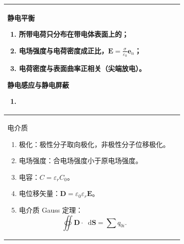 \documentclass[UTF8,fontset=fandol,zihao=5]{ctexart}
\newcommand{\vect}[1]{\bm{#1}}
\newcommand{\dif}{\mathop{}\!\mathrm{d}}
\begin{document}
\begin{longtable}{|>{\raggedright\arraybackslash}p{}|>{\raggedright\arraybackslash}p{}|}
静电平衡
\begin{enumerate}
  \item 所带电荷只分布在带电体表面上的；
  \item 电场强度与电荷密度成正比，\(\displaystyle\vect E=\frac{\sigma}{\varepsilon_0}\vect e_n\)；
  \item 电荷密度与表面曲率正相关（尖端放电）。
\end{enumerate}

静电感应与静电屏蔽
\begin{enumerate}
  \item
\end{enumerate}
& \\ \hline

\centering 电介质
\begin{enumerate}
  \item 极化：极性分子取向极化，非极性分子位移极化。
  \item 电场强度：合电场强度小于原电场强度。
  \item 电容：\(C=\varepsilon_rC_0\)。
  \item 电位移矢量：\(\vect D=\varepsilon_0\varepsilon_r\vect E\)。
  \item 电介质 Gauss 定理：
  \[
    \oiint\vect D\cdot\dif\vect S=\sum q_{0i}.
  \]
\end{enumerate}
\par\vspace{1.2em}
& \\ \hline

\end{longtable}
\end{document}
